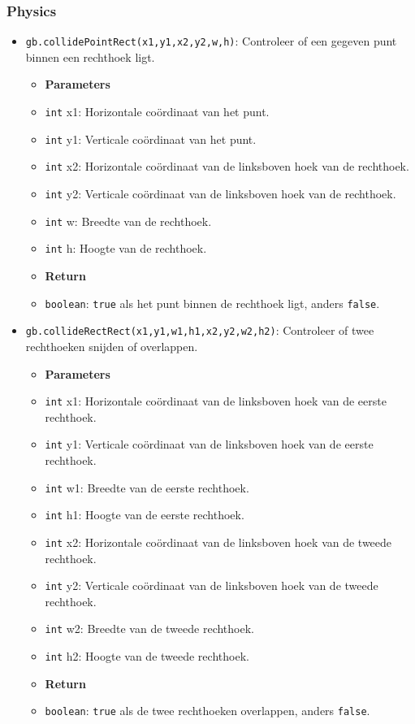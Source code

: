 \documentclass[a4paper,titlepage,12pt]{article}
\begin{document}
	\subsubsection{Physics}
	\begin{itemize}
		\item \texttt{gb.collidePointRect(x1,y1,x2,y2,w,h)}: 
		Controleer of een gegeven punt binnen een rechthoek ligt.
		\begin{itemize}
			\item [] \textbf{Parameters}
			\item \texttt{int} x1: Horizontale coördinaat van het punt.
			\item \texttt{int} y1: Verticale coördinaat van het punt.
			\item \texttt{int} x2: Horizontale coördinaat van de linksboven hoek van de rechthoek.
			\item \texttt{int} y2: Verticale coördinaat van de linksboven hoek van de rechthoek.
			\item \texttt{int} w: Breedte van de rechthoek.
			\item \texttt{int} h: Hoogte van de rechthoek.
		\end{itemize}
		\begin{itemize}
			\item [] \textbf{Return}
			\item \texttt{boolean}: \texttt{true} als het punt binnen de rechthoek ligt, anders \texttt{false}.
		\end{itemize}
	
		\samepage\item \texttt{gb.collideRectRect(x1,y1,w1,h1,x2,y2,w2,h2)}: Controleer of twee rechthoeken snijden of overlappen.
		\begin{itemize}
			\item [] \textbf{Parameters}
			\item \texttt{int} x1: Horizontale coördinaat van de linksboven hoek van de eerste rechthoek.
			\item \texttt{int} y1: Verticale coördinaat van de linksboven hoek van de eerste rechthoek.
			\item \texttt{int} w1: Breedte van de eerste rechthoek.
			\item \texttt{int} h1: Hoogte van de eerste rechthoek.
			\item \texttt{int} x2: Horizontale coördinaat van de linksboven hoek van de tweede rechthoek.
			\item \texttt{int} y2: Verticale coördinaat van de linksboven hoek van de tweede rechthoek.
			\item \texttt{int} w2: Breedte van de tweede rechthoek.
			\item \texttt{int} h2: Hoogte van de tweede rechthoek.
		\end{itemize}
		\begin{itemize}
			\item [] \textbf{Return}
			\item \texttt{boolean}: \texttt{true} als de twee rechthoeken overlappen, anders \texttt{false}.
		\end{itemize}
	

\end{itemize}
\end{document}
